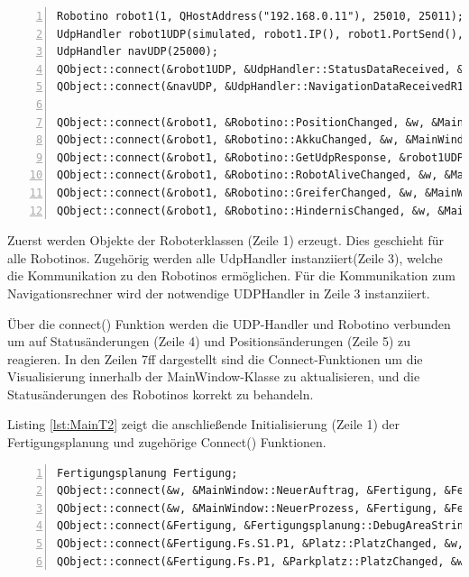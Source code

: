 \begin{lstlisting}[frame=single, breaklines=true, numbers=left, stepnumber=1, firstnumber=1, numberstyle = \tiny, caption=Main Funktion Teil 1,label=lst:MainT1]
Robotino robot1(1, QHostAddress("192.168.0.11"), 25010, 25011);
UdpHandler robot1UDP(simulated, robot1.IP(), robot1.PortSend(), robot1.PortReceive());
UdpHandler navUDP(25000);
QObject::connect(&robot1UDP, &UdpHandler::StatusDataReceived, &robot1, &Robotino::UpdateValues);
QObject::connect(&navUDP, &UdpHandler::NavigationDataReceivedR1, &robot1, &Robotino::UpdatePosition);

QObject::connect(&robot1, &Robotino::PositionChanged, &w, &MainWindow::UpdateRobotino1Position);
QObject::connect(&robot1, &Robotino::AkkuChanged, &w, &MainWindow::UpdateRobotino1Akku);
QObject::connect(&robot1, &Robotino::GetUdpResponse, &robot1UDP, &UdpHandler::sendRobotAlive);
QObject::connect(&robot1, &Robotino::RobotAliveChanged, &w, &MainWindow::UpdateRobotino1Alive);
QObject::connect(&robot1, &Robotino::GreiferChanged, &w, &MainWindow::UpdateRobotino1Greifer);
QObject::connect(&robot1, &Robotino::HindernisChanged, &w, &MainWindow::UpdateRobotino1Hindernis);

\end{lstlisting}

Zuerst werden Objekte der Roboterklassen (Zeile 1) erzeugt. Dies geschieht für alle Robotinos. Zugehörig werden alle UdpHandler instanziiert(Zeile 3), welche die Kommunikation zu den Robotinos ermöglichen. Für die Kommunikation zum Navigationsrechner wird der notwendige UDPHandler in Zeile 3 instanziiert. 

Über die connect() Funktion werden die UDP-Handler und Robotino verbunden um auf Statusänderungen (Zeile 4) und Positionsänderungen (Zeile 5) zu reagieren. In den Zeilen 7ff dargestellt sind die Connect-Funktionen um die Visualisierung innerhalb der MainWindow-Klasse zu aktualisieren, und die Statusänderungen des Robotinos korrekt zu behandeln.  

Listing \ref{lst:MainT2} zeigt die anschließende Initialisierung (Zeile 1) der Fertigungsplanung und zugehörige Connect() Funktionen. 

\begin{lstlisting}[frame=single, breaklines=true, numbers=left, stepnumber=1, firstnumber=1, numberstyle = \tiny, caption=Main Funktion Teil 2 - Fertigungsplanung,label=lst:MainT2]
Fertigungsplanung Fertigung;
QObject::connect(&w, &MainWindow::NeuerAuftrag, &Fertigung, &Fertigungsplanung::AddAuftrag);
QObject::connect(&w, &MainWindow::NeuerProzess, &Fertigung, &Fertigungsplanung::AddProzess);
QObject::connect(&Fertigung, &Fertigungsplanung::DebugAreaString, &w, &MainWindow::WriteToDebugTextArea);
QObject::connect(&Fertigung.Fs.S1.P1, &Platz::PlatzChanged, &w, &MainWindow::UpdateStationsplatz);
QObject::connect(&Fertigung.Fs.P1, &Parkplatz::PlatzChanged, &w, &MainWindow::UpdateParkplatz);

\end{lstlisting}

